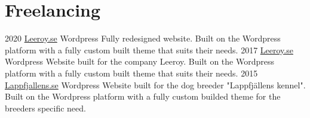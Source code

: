 \newpage
\section{Freelancing}

\begin{entrylist}
    \entry
        {2020}
        {\href{https://leeroy.se}{Leeroy.se}}
        {Wordpress}
        {Fully redesigned website. Built on the Wordpress platform with a fully custom built theme that suits their needs.}
    \entry
        {2017}
        {\href{https://leeroy.se}{Leeroy.se}}
        {Wordpress}
        {Website built for the company Leeroy. Built on the Wordpress platform with a fully custom built theme that suits their needs.}
    \entry
        {2015}
        {\href{http://lappfjallens.se}{Lappfjallens.se}}
        {Wordpress}
        {Website built for the dog breeder "Lappfjällens kennel". Built on the Wordpress platform with a fully custom builded theme for the breeders specific need.}
\end{entrylist}